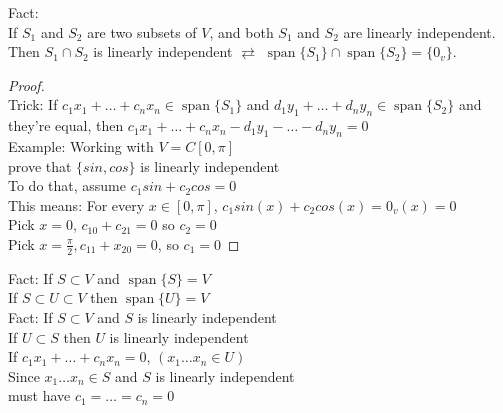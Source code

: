 \documentclass[11pt]{article}
\DeclareMathOperator{\Span}{span}
\begin{document}
Fact:\\
If $S_1$ and $S_2$ are two subsets of $V$, and both $S_1$ and $S_2$ are linearly independent.\\
Then $S_1\cap S_2$ is linearly independent $\rightleftarrows$ $\Span\{S_1\}\cap\Span\{S_2\}=\{0_v\}$.
\begin{proof}
\hfill\\
	Trick: If $c_1x_1+\ldots +c_nx_n\in\Span\{S_1\}$ and $d_1y_1+\ldots +d_ny_n\in\Span\{S_2\}$ and they're equal, then $c_1x_1+\ldots +c_nx_n-d_1y_1-\ldots-d_ny_n=0$\\
	Example: Working with $V=C[0,\pi]$\\
	prove that $\{sin,cos\}$ is linearly independent\\
	To do that, assume $c_1sin+c_2cos=0$\\
	This means: For every $x\in [0,\pi]$, $c_1sin(x)+c_2cos(x)=0_v(x)=0$\\
	Pick $x=0$, $c_10+c_21=0$ so $c_2=0$\\
	Pick $x=\frac{\pi}{2}, c_11+x_20=0$, so $c_1=0$
\end{proof}

Fact: If $S\subset V$ and $\Span\{S\}=V$\\
If $S\subset U\subset V$ then $\Span\{U\}=V$\\

Fact: If $S\subset V$ and $S$ is linearly independent\\
If $U\subset S$ then $U$ is linearly independent\\
If $c_1x_1+\ldots+c_n x_n=0$, $(x_1\ldots x_n\in U)$\\
Since $x_1\ldots x_n\in S$ and $S$ is linearly independent\\
must have $c_1=\ldots=c_n=0$
\end{document}
